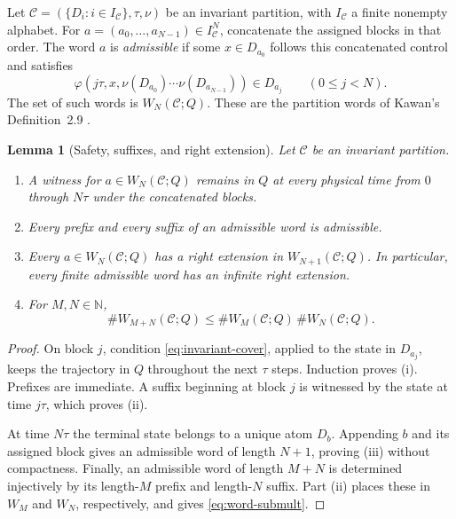 \documentclass[11pt,reqno]{amsart}
\numberwithin{equation}{section}
\newtheorem{lemma}[theorem]{Lemma}
\theoremstyle{definition}
\newcommand{\N}{\mathbb N}
\newcommand{\C}{\mathcal C}
\begin{document}
Let $\C=(\{D_i:i\in I_\C\},\tau,\nu)$ be an invariant partition, with
$I_\C$ a finite nonempty alphabet.  For
$a=(a_0,\ldots,a_{N-1})\in I_\C^N$, concatenate the assigned blocks in that
order.  The word $a$ is \emph{admissible} if some $x\in D_{a_0}$ follows this
concatenated control and satisfies
\begin{equation}\label{eq:admissible-word}
 \varphi(j\tau,x,\nu(D_{a_0})\cdots\nu(D_{a_{N-1}}))
 \in D_{a_j}\qquad(0\le j<N).
\end{equation}
The set of such words is $W_N(\C;Q)$.  These are the partition words of
Kawan's Definition~2.9 \cite[pp.~79--80]{Kawan2013}.

\begin{lemma}[Safety, suffixes, and right extension]\label{lem:safety}
Let $\C$ be an invariant partition.
\begin{enumerate}
\item A witness for $a\in W_N(\C;Q)$ remains in $Q$ at every physical time
from $0$ through $N\tau$ under the concatenated blocks.
\item Every prefix and every suffix of an admissible word is admissible.
\item Every $a\in W_N(\C;Q)$ has a right extension in
$W_{N+1}(\C;Q)$.  In particular, every finite admissible word has an
infinite right extension.
\item For $M,N\in\N$,
\begin{equation}\label{eq:word-submult}
 \#W_{M+N}(\C;Q)
 \le \#W_M(\C;Q)\,\#W_N(\C;Q).
\end{equation}
\end{enumerate}
\end{lemma}

\begin{proof}
On block $j$, condition \eqref{eq:invariant-cover}, applied to the state in
$D_{a_j}$, keeps the trajectory in $Q$ throughout the next $\tau$ steps.
Induction proves (i).  Prefixes are immediate.  A suffix beginning at block
$j$ is witnessed by the state at time $j\tau$, which proves (ii).

At time $N\tau$ the terminal state belongs to a unique atom $D_b$.
Appending $b$ and its assigned block gives an admissible word of length
$N+1$, proving (iii) without compactness.  Finally, an admissible word of
length $M+N$ is determined injectively by its length-$M$ prefix and
length-$N$ suffix.  Part (ii) places these in $W_M$ and $W_N$, respectively,
and gives \eqref{eq:word-submult}.
\end{proof}
\end{document}
